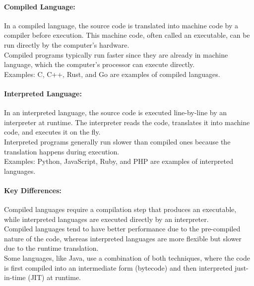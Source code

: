 \documentclass[12pt,halfline,a4paper,]{ouparticle}
\begin{document}
\hypertarget{compiled-language}{%
\paragraph{Compiled Language:}\label{compiled-language}}

\hfill\break
In a compiled language, the source code is translated into machine code
by a compiler before execution. This machine code, often called an
executable, can be run directly by the computer's hardware.\\
Compiled programs typically run faster since they are already in machine
language, which the computer's processor can execute directly.\\
Examples: C, C++, Rust, and Go are examples of compiled languages.

\hypertarget{interpreted-language}{%
\paragraph{Interpreted Language:}\label{interpreted-language}}

\hfill\break
In an interpreted language, the source code is executed line-by-line by
an interpreter at runtime. The interpreter reads the code, translates it
into machine code, and executes it on the fly.\\
Interpreted programs generally run slower than compiled ones because the
translation happens during execution.\\
Examples: Python, JavaScript, Ruby, and PHP are examples of interpreted
languages.

\hypertarget{key-differences}{%
\paragraph{Key Differences:}\label{key-differences}}

Compiled languages require a compilation step that produces an
executable, while interpreted languages are executed directly by an
interpreter.\\
Compiled languages tend to have better performance due to the
pre-compiled nature of the code, whereas interpreted languages are more
flexible but slower due to the runtime translation.\\
Some languages, like Java, use a combination of both techniques, where
the code is first compiled into an intermediate form (bytecode) and then
interpreted just-in-time (JIT) at runtime.\\
\end{document}
